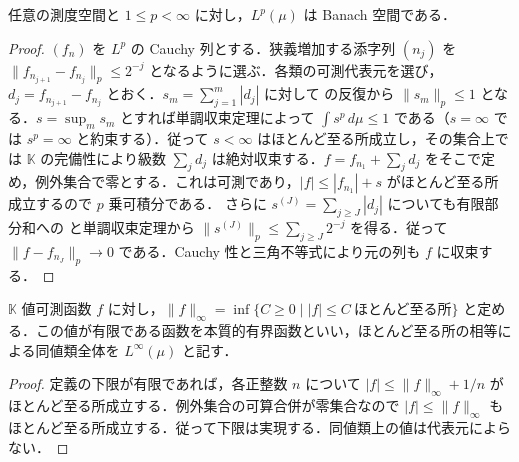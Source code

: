 \begin{prop}[L^p 空間の完備性]
任意の測度空間と $1\leq p<\infty$ に対し，$L^p(\mu)$ は Banach 空間である．
\end{prop}
\begin{proof}
$(f_n)$ を $L^p$ の Cauchy 列とする．狭義増加する添字列 $(n_j)$ を $\|f_{n_{j+1}}-f_{n_j}\|_p\leq2^{-j}$ となるように選ぶ．各類の可測代表元を選び，$d_j=f_{n_{j+1}}-f_{n_j}$ とおく．$s_m=\sum_{j=1}^m|d_j|$ に対して  の反復から $\|s_m\|_p\leq1$ となる．$s=\sup_m s_m$ とすれば単調収束定理によって $\int s^p\,d\mu\leq1$ である（$s=\infty$ では $s^p=\infty$ と約束する）．従って $s<\infty$ はほとんど至る所成立し，その集合上では $\mathbb K$ の完備性により級数 $\sum_j d_j$ は絶対収束する．$f=f_{n_1}+\sum_jd_j$ をそこで定め，例外集合で零とする．これは可測であり，$|f|\leq |f_{n_1}|+s$ がほとんど至る所成立するので $p$ 乗可積分である．
さらに $s^{(J)}=\sum_{j\geq J}|d_j|$ についても有限部分和への  と単調収束定理から $\|s^{(J)}\|_p\leq\sum_{j\geq J}2^{-j}$ を得る．従って $\|f-f_{n_J}\|_p\to0$ である．Cauchy 性と三角不等式により元の列も $f$ に収束する．
\end{proof}
\begin{defn}[本質的上限とL^∞ 空間]
$\mathbb K$ 値可測函数 $f$ に対し，$\|f\|_\infty=\inf\{C\geq0\mid |f|\leq C\ \text{ほとんど至る所}\}$ と定める．この値が有限である函数を本質的有界函数といい，ほとんど至る所の相等による同値類全体を $L^\infty(\mu)$ と記す．
\end{defn}
\begin{proof}
定義の下限が有限であれば，各正整数 $n$ について $|f|\leq\|f\|_\infty+1/n$ がほとんど至る所成立する．例外集合の可算合併が零集合なので $|f|\leq\|f\|_\infty$ もほとんど至る所成立する．従って下限は実現する．同値類上の値は代表元によらない．
\end{proof}
